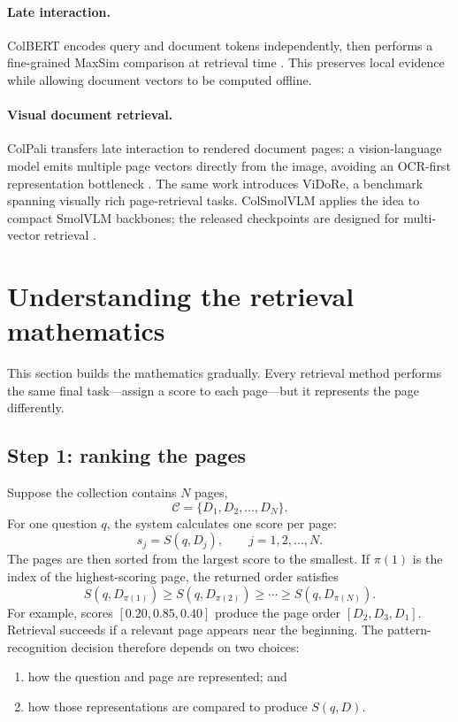 \documentclass[11pt,a4paper]{article}
\begin{document}
\paragraph{Late interaction.} ColBERT encodes query and document tokens independently, then performs a fine-grained MaxSim comparison at retrieval time \cite{khattab2020colbert}. This preserves local evidence while allowing document vectors to be computed offline.

\paragraph{Visual document retrieval.} ColPali transfers late interaction to rendered document pages: a vision-language model emits multiple page vectors directly from the image, avoiding an OCR-first representation bottleneck \cite{faysse2024colpali}. The same work introduces ViDoRe, a benchmark spanning visually rich page-retrieval tasks. ColSmolVLM applies the idea to compact SmolVLM backbones; the released checkpoints are designed for multi-vector retrieval \cite{colsmolmodel,smolvlm2025}.

\section{Understanding the retrieval mathematics}

This section builds the mathematics gradually. Every retrieval method performs the same final task---assign a score to each page---but it represents the page differently.

\subsection{Step 1: ranking the pages}

Suppose the collection contains $N$ pages,
\begin{equation}
\mathcal C=\{D_1,D_2,\ldots,D_N\}.
\end{equation}
For one question $q$, the system calculates one score per page:
\begin{equation}
s_j=S(q,D_j), \qquad j=1,2,\ldots,N.
\end{equation}
The pages are then sorted from the largest score to the smallest. If $\pi(1)$ is the index of the highest-scoring page, the returned order satisfies
\begin{equation}
S(q,D_{\pi(1)})\ge S(q,D_{\pi(2)})\ge\cdots\ge S(q,D_{\pi(N)}).
\end{equation}
For example, scores $[0.20,0.85,0.40]$ produce the page order $[D_2,D_3,D_1]$. Retrieval succeeds if a relevant page appears near the beginning. The pattern-recognition decision therefore depends on two choices:
\begin{enumerate}
  \item how the question and page are represented; and
  \item how those representations are compared to produce $S(q,D)$.
\end{enumerate}
\end{document}
